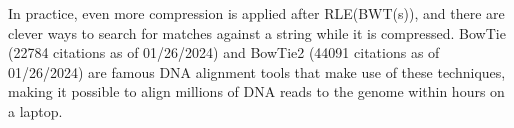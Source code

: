 In practice, even more compression is applied after RLE(BWT(s)), and there are clever ways to search for matches against a string while it is compressed. BowTie (22784 citations as of 01/26/2024) and BowTie2 (44091 citations as of 01/26/2024) are famous DNA alignment tools that make use of these techniques, making it possible to align millions of DNA reads to the genome within hours on a laptop.
